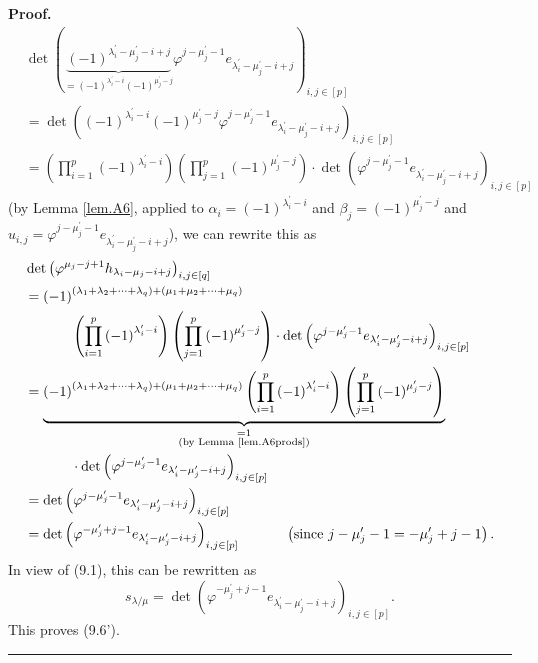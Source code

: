 \documentclass[numbers=enddot,12pt,final,onecolumn,notitlepage]{scrartcl}%
\theoremstyle{definition}
\newenvironment{proof}[1][Proof]{\noindent\textbf{#1.} }{\ \rule{0.5em}{0.5em}}
\let\prodnonlimits\prod
\renewcommand{\prod}{\prodnonlimits\limits}
\begin{document}
\begin{enumerate}
\begin{proof}
\begin{align*}
&  \det\left(  \underbrace{\left(  -1\right)  ^{\lambda_{i}^{\prime}-\mu
_{j}^{\prime}-i+j}}_{=\left(  -1\right)  ^{\lambda_{i}^{\prime}-i}\left(
-1\right)  ^{\mu_{j}^{\prime}-j}}\varphi^{j-\mu_{j}^{\prime}-1}e_{\lambda
_{i}^{\prime}-\mu_{j}^{\prime}-i+j}\right)  _{i,j\in\left[  p\right]  }\\
&  =\det\left(  \left(  -1\right)  ^{\lambda_{i}^{\prime}-i}\left(  -1\right)
^{\mu_{j}^{\prime}-j}\varphi^{j-\mu_{j}^{\prime}-1}e_{\lambda_{i}^{\prime}%
-\mu_{j}^{\prime}-i+j}\right)  _{i,j\in\left[  p\right]  }\\
&  =\left(  \prod_{i=1}^{p}\left(  -1\right)  ^{\lambda_{i}^{\prime}%
-i}\right)  \left(  \prod_{j=1}^{p}\left(  -1\right)  ^{\mu_{j}^{\prime}%
-j}\right)  \cdot\det\left(  \varphi^{j-\mu_{j}^{\prime}-1}e_{\lambda
_{i}^{\prime}-\mu_{j}^{\prime}-i+j}\right)  _{i,j\in\left[  p\right]  }%
\end{align*}
(by Lemma \ref{lem.A6}, applied to $\alpha_{i}=\left(  -1\right)
^{\lambda_{i}^{\prime}-i}$ and $\beta_{j}=\left(  -1\right)  ^{\mu_{j}%
^{\prime}-j}$ and $u_{i,j}=\varphi^{j-\mu_{j}^{\prime}-1}e_{\lambda
_{i}^{\prime}-\mu_{j}^{\prime}-i+j}$), we can rewrite this as%
\begin{align*}
&  \det\left(  \varphi^{\mu_{j}-j+1}h_{\lambda_{i}-\mu_{j}-i+j}\right)
_{i,j\in\left[  q\right]  }\\
&  =\left(  -1\right)  ^{\left(  \lambda_{1}+\lambda_{2}+\cdots+\lambda
_{q}\right)  +\left(  \mu_{1}+\mu_{2}+\cdots+\mu_{q}\right)  }\\
&  \ \ \ \ \ \ \ \ \ \ \left(  \prod_{i=1}^{p}\left(  -1\right)  ^{\lambda
_{i}^{\prime}-i}\right)  \left(  \prod_{j=1}^{p}\left(  -1\right)  ^{\mu
_{j}^{\prime}-j}\right)  \cdot\det\left(  \varphi^{j-\mu_{j}^{\prime}%
-1}e_{\lambda_{i}^{\prime}-\mu_{j}^{\prime}-i+j}\right)  _{i,j\in\left[
p\right]  }\\
&  =\underbrace{\left(  -1\right)  ^{\left(  \lambda_{1}+\lambda_{2}%
+\cdots+\lambda_{q}\right)  +\left(  \mu_{1}+\mu_{2}+\cdots+\mu_{q}\right)
}\left(  \prod_{i=1}^{p}\left(  -1\right)  ^{\lambda_{i}^{\prime}-i}\right)
\left(  \prod_{j=1}^{p}\left(  -1\right)  ^{\mu_{j}^{\prime}-j}\right)
}_{\substack{=1\\\text{(by Lemma \ref{lem.A6prods})}}}\\
&  \ \ \ \ \ \ \ \ \ \ \cdot\det\left(  \varphi^{j-\mu_{j}^{\prime}%
-1}e_{\lambda_{i}^{\prime}-\mu_{j}^{\prime}-i+j}\right)  _{i,j\in\left[
p\right]  }\\
&  =\det\left(  \varphi^{j-\mu_{j}^{\prime}-1}e_{\lambda_{i}^{\prime}-\mu
_{j}^{\prime}-i+j}\right)  _{i,j\in\left[  p\right]  }\\
&  =\det\left(  \varphi^{-\mu_{j}^{\prime}+j-1}e_{\lambda_{i}^{\prime}-\mu
_{j}^{\prime}-i+j}\right)  _{i,j\in\left[  p\right]  }%
\ \ \ \ \ \ \ \ \ \ \left(  \text{since }j-\mu_{j}^{\prime}-1=-\mu_{j}%
^{\prime}+j-1\right)  .
\end{align*}
In view of (9.1), this can be rewritten as%
\[
s_{\lambda/\mu}=\det\left(  \varphi^{-\mu_{j}^{\prime}+j-1}e_{\lambda
_{i}^{\prime}-\mu_{j}^{\prime}-i+j}\right)  _{i,j\in\left[  p\right]  }.
\]
This proves (9.6').
\end{proof}


\end{enumerate}
\end{document}
